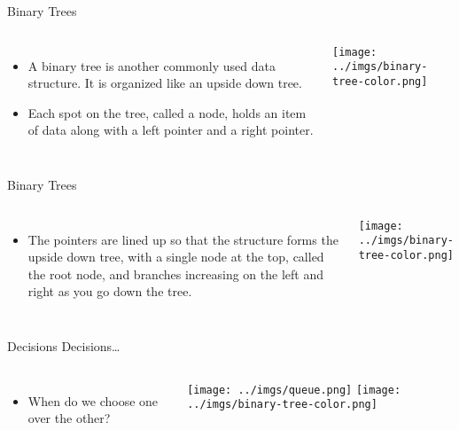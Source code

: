 \documentclass{beamer}
\begin{document}
\begin{frame}{Binary Trees}
\begin{columns}[c]
\begin{itemize}
\item A binary tree is another commonly used data structure. It is organized like an upside down tree. 
\item Each spot on the tree, called a node, holds an item of data along with a left pointer and a right pointer. 
\end{itemize}
\texttt{[image: ../imgs/binary-tree-color.png]}
\end{columns}
\end{frame}

\begin{frame}{Binary Trees}
\begin{columns}[c]
\begin{itemize}
\item The pointers are lined up so that the structure forms the upside down tree, with a single node at the top, called the root node, and branches increasing on the left and right as you go down the tree.
\end{itemize}
\texttt{[image: ../imgs/binary-tree-color.png]}
\end{columns}
\end{frame}

\begin{frame}{Decisions Decisions\ldots}
\begin{columns}[c]
\begin{itemize}
\item When do we choose one over the other?
\end{itemize}
\texttt{[image: ../imgs/queue.png]}
\texttt{[image: ../imgs/binary-tree-color.png]}
\end{columns}
\end{frame}
\end{document}
